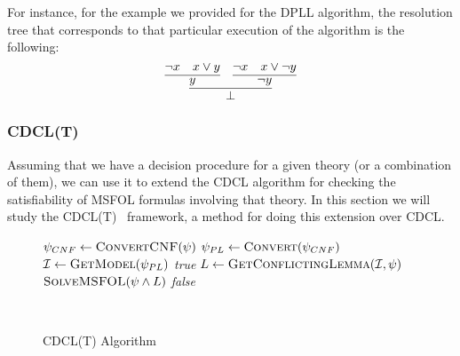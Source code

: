 For instance, for the example we provided for the DPLL algorithm, the resolution tree that corresponds to that
particular execution of the algorithm is the following:
\[
  \infer{\bot}{\infer{y}{\neg x & x \vee y} & \infer{\neg y}{\neg x & x \vee \neg y}}
\]


\subsubsection{CDCL(T)}

Assuming that we have a decision procedure for a given theory (or a combination of them), we can use it to extend the CDCL algorithm for checking the satisfiability of MSFOL formulas involving that theory. In this section we will study the CDCL(T)~\cite{cdcl_t} framework, a method for doing this extension over CDCL.\

\begin{figure}[t]
\begin{algorithmic}[1]
\State $\psi_{CNF} \gets \Call{ConvertCNF}{\psi}$
\State $\psi_{PL} \gets \Call{Convert}{\psi_{CNF}}$ 
  \State $\mathcal{I} \gets \Call{GetModel}{\psi_{PL}}$
   
    \State \Return \textit{true}
  \EndIf
  \State $L \gets \Call{GetConflictingLemma}{\mathcal{I}, \psi}$
  \State \Return $\Call{SolveMSFOL}{\psi \wedge L}$
\EndIf
\State \Return \textit{false}
\EndFunction
\end{algorithmic}
\caption{CDCL(T) Algorithm}~\label{cdclTAlgo}
\end{figure}

